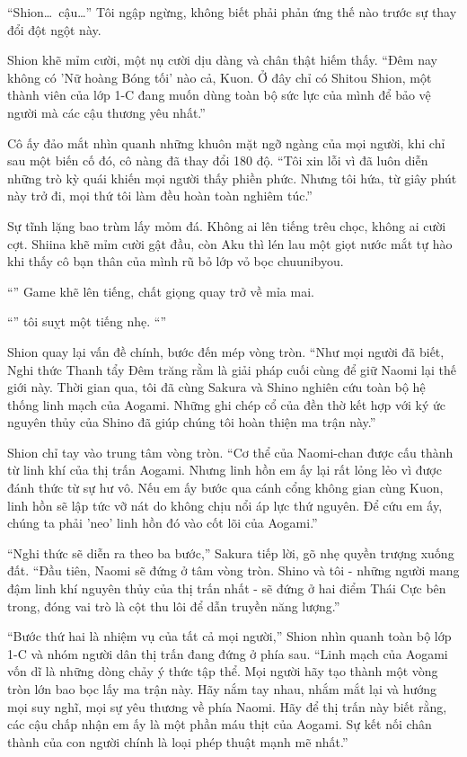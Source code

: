 \documentclass[../main.tex]{subfiles}
\begin{document}
``Shion\dots\ cậu\dots'' Tôi ngập ngừng, không biết phải phản ứng thế nào trước sự thay đổi đột ngột này.

Shion khẽ mỉm cười, một nụ cười dịu dàng và chân thật hiếm thấy. ``Đêm nay không có 'Nữ hoàng Bóng tối' nào cả, Kuon. Ở đây chỉ có Shitou Shion, một thành viên của lớp 1-C đang muốn dùng toàn bộ sức lực của mình để bảo vệ người mà các cậu thương yêu nhất.''

Cô ấy đảo mắt nhìn quanh những khuôn mặt ngỡ ngàng của mọi người, khi chỉ sau một biến cố đó, cô nàng đã thay đổi 180 độ. ``Tôi xin lỗi vì đã luôn diễn những trò kỳ quái khiến mọi người thấy phiền phức. Nhưng tôi hứa, từ giây phút này trở đi, mọi thứ tôi làm đều hoàn toàn nghiêm túc.''

Sự tĩnh lặng bao trùm lấy mỏm đá. Không ai lên tiếng trêu chọc, không ai cười cợt. Shiina khẽ mỉm cười gật đầu, còn Aku thì lén lau một giọt nước mắt tự hào khi thấy cô bạn thân của mình rũ bỏ lớp vỏ bọc chuunibyou.

``'' Game khẽ lên tiếng, chất giọng quay trở về mỉa mai.

``'' tôi suỵt một tiếng nhẹ. ``''

Shion quay lại vấn đề chính, bước đến mép vòng tròn. ``Như mọi người đã biết, Nghi thức Thanh tẩy Đêm trăng rằm là giải pháp cuối cùng để giữ Naomi lại thế giới này. Thời gian qua, tôi đã cùng Sakura và Shino nghiên cứu toàn bộ hệ thống linh mạch của Aogami. Những ghi chép cổ của đền thờ kết hợp với ký ức nguyên thủy của Shino đã giúp chúng tôi hoàn thiện ma trận này.''

Shion chỉ tay vào trung tâm vòng tròn. ``Cơ thể của Naomi-chan được cấu thành từ linh khí của thị trấn Aogami. Nhưng linh hồn em ấy lại rất lỏng lẻo vì được đánh thức từ sự hư vô. Nếu em ấy bước qua cánh cổng không gian cùng Kuon, linh hồn sẽ lập tức vỡ nát do không chịu nổi áp lực thứ nguyên. Để cứu em ấy, chúng ta phải 'neo' linh hồn đó vào cốt lõi của Aogami.''

``Nghi thức sẽ diễn ra theo ba bước,'' Sakura tiếp lời, gõ nhẹ quyền trượng xuống đất. ``Đầu tiên, Naomi sẽ đứng ở tâm vòng tròn. Shino và tôi - những người mang đậm linh khí nguyên thủy của thị trấn nhất - sẽ đứng ở hai điểm Thái Cực bên trong, đóng vai trò là cột thu lôi để dẫn truyền năng lượng.''

``Bước thứ hai là nhiệm vụ của tất cả mọi người,'' Shion nhìn quanh toàn bộ lớp 1-C và nhóm người dân thị trấn đang đứng ở phía sau. ``Linh mạch của Aogami vốn dĩ là những dòng chảy ý thức tập thể. Mọi người hãy tạo thành một vòng tròn lớn bao bọc lấy ma trận này. Hãy nắm tay nhau, nhắm mắt lại và hướng mọi suy nghĩ, mọi sự yêu thương về phía Naomi. Hãy để thị trấn này biết rằng, các cậu chấp nhận em ấy là một phần máu thịt của Aogami. Sự kết nối chân thành của con người chính là loại phép thuật mạnh mẽ nhất.''
\end{document}
